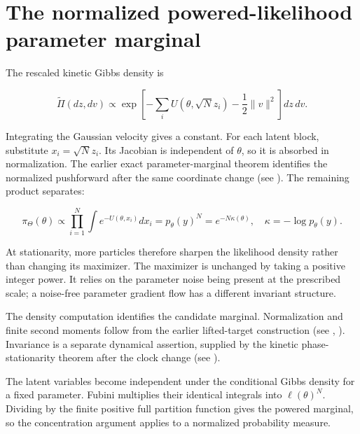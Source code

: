 \documentclass[11pt,a4paper]{article}
\begin{document}
\section{\texorpdfstring{The normalized powered-likelihood parameter marginal}{The normalized powered-likelihood parameter marginal}}


The rescaled kinetic Gibbs density is


\[\widetilde\Pi(dz,dv)\propto
\exp\left[-\sum_iU(\theta,\sqrt Nz_i)-\frac12\|v\|^2\right]dz\,dv.\]


Integrating the Gaussian velocity gives a constant. For each latent block,
substitute \(x_i=\sqrt Nz_i\). Its Jacobian is independent of \(\theta\),
so it is absorbed in normalization. The earlier exact parameter-marginal theorem identifies the normalized pushforward after the same coordinate change (see \cite[Section~3.9.9]{LangevinLean2026IPLA}). The remaining product separates:


\[\pi_\Theta(\theta)\propto
\prod_{i=1}^N\int e^{-U(\theta,x_i)}dx_i
=p_\theta(y)^N=e^{-N\kappa(\theta)},\quad
\kappa=-\log p_\theta(y).\]


At stationarity, more particles therefore sharpen the likelihood density
rather than changing its maximizer. The maximizer is unchanged by taking a positive integer power.
It relies on the parameter noise being present at the prescribed scale; a
noise-free parameter gradient flow has a different invariant structure.




The density computation identifies the candidate marginal. Normalization and finite second moments follow from the earlier lifted-target construction (see \cite[Section~3.5.1]{LangevinLean2026IPLA}, \cite[Section~3.5.1]{LangevinLean2026IPLA}). Invariance is a separate dynamical assertion, supplied by the kinetic phase-stationarity theorem after the clock change (see \cite[Section~3.58.3]{LangevinLean2026Kinetic}).



The latent variables become independent under the conditional Gibbs density for a fixed parameter. Fubini multiplies their identical integrals into \(\ell(\theta)^N\). Dividing by the finite positive full partition function gives the powered marginal, so the concentration argument applies to a normalized probability measure.
\end{document}
